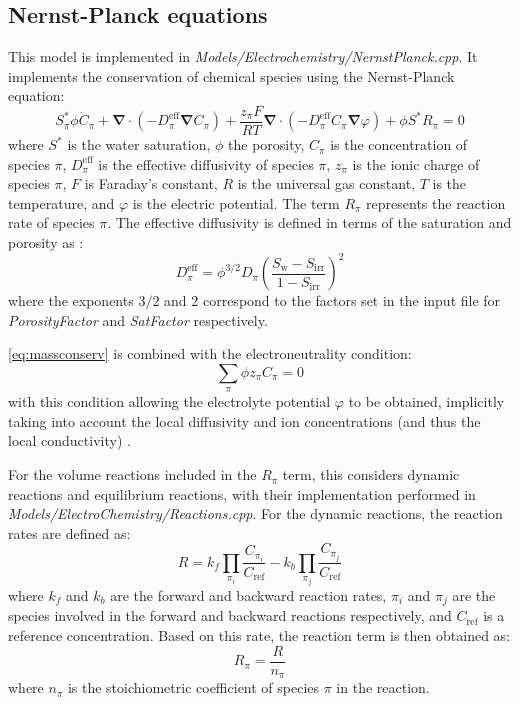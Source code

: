 \documentclass[3p]{elsarticle} %
\begin{document}
\subsection{Nernst-Planck equations}
This model is implemented in \textit{Models/Electrochemistry/NernstPlanck.cpp}. It implements the conservation of chemical species using the Nernst-Planck equation:
\begin{equation}
    S^*_\pi \phi \dot{C}_\pi +\bm{\nabla}\cdot\left(-D_\pi^{\text{eff}} \bm{\nabla}C_\pi\right)+\frac{z_\pi F}{RT}\bm{\nabla}\cdot\left(-D_\pi^{\text{eff}} C_\pi \bm{\nabla}\varphi\right) + \phi S^* R_\pi = 0 \label{eq:massconserv}
\end{equation}
where $S^*$ is the water saturation, $\phi$ the porosity, $C_\pi$ is the concentration of species $\pi$, $D_\pi^{\text{eff}}$ is the effective diffusivity of species $\pi$, $z_\pi$ is the ionic charge of species $\pi$, $F$ is Faraday's constant, $R$ is the universal gas constant, $T$ is the temperature, and $\varphi$ is the electric potential. The term $R_\pi$ represents the reaction rate of species $\pi$. The effective diffusivity is defined in terms of the saturation and porosity as \citep{Tartakovsky2019, Ghanbarian2013}:
\begin{equation}
    D_\pi^{\text{eff}} = \phi^{3/2} D_\pi \left(\frac{S_\text{w}-S_\text{irr}}{1-S_\text{irr}}\right)^2 \label{eq:Deff}
\end{equation}
where the exponents $3/2$ and $2$ correspond to the factors set in the input file for \textit{PorosityFactor} and \textit{SatFactor} respectively. 

\cref{eq:massconserv} is combined with the electroneutrality condition:
\begin{equation}
    \sum_\pi \phi z_\pi C_\pi = 0 \label{eq:electroneutrality}
\end{equation}
with this condition allowing the electrolyte potential $\varphi$ to be obtained, implicitly taking into account the local diffusivity and ion concentrations (and thus the local conductivity) \citep{Feldberg2000}. 

For the volume reactions included in the $R_\pi$ term, this considers dynamic reactions and equilibrium reactions, with their implementation performed in \textit{Models/ElectroChemistry/Reactions.cpp}. For the dynamic reactions, the reaction rates are defined as:
\begin{equation}
	R = k_f \prod_{\pi_i} \frac{C_{\pi_i}}{C_\text{ref}} - k_b \prod_{\pi_j} \frac{C_{\pi_j}}{C_\text{ref}} \label{eq:dynamic}
\end{equation}
where $k_f$ and $k_b$ are the forward and backward reaction rates, $\pi_i$ and $\pi_j$ are the species involved in the forward and backward reactions respectively, and $C_\text{ref}$ is a reference concentration. Based on this rate, the reaction term is then obtained as:
\begin{equation}
	R_\pi = \frac{R}{n_\pi} \label{eq:reactionrate}
\end{equation}
where $n_\pi$ is the stoichiometric coefficient of species $\pi$ in the reaction.
\end{document}
